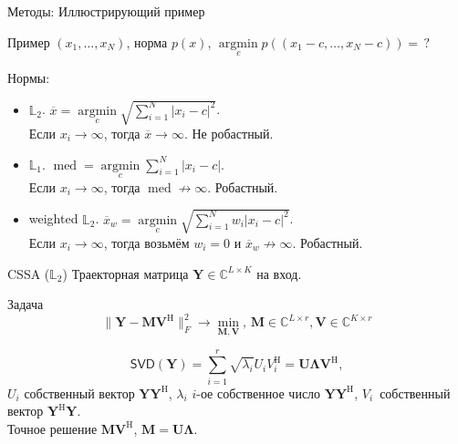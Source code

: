 \documentclass[ucs, notheorems, handout]{beamer}
\DeclareMathOperator{\med}{med}
\DeclareMathOperator*{\argmin}{argmin}
\newcommand{\tX}[1]{\mathsf{#1}}
\begin{document}
\begin{frame}{Методы: Иллюстрирующий пример}
    \begin{block}{Пример}
    $(x_1, \ldots, x_N)$, норма $p(x)$, $\argmin\limits_{c}p((x_1 - c, \ldots, x_N - c)) =\, ?$
    \end{block}
    Нормы:
    \begin{itemize}
        \item $\mathbb{L}_2$. $\overline{x} = \argmin\limits_{c} \sqrt{\sum_{i = 1}^{N} |x_i - c|^2}$. \\
        Если $x_i \to \infty$, тогда $\overline{x} \to \infty$. Не робастный.
        \item $\mathbb{L}_1$. $\med = \argmin\limits_{c} \sum_{i = 1}^{N} |x_i - c|$. \\
        Если $x_i \to \infty$, тогда $\med \not\to \infty$. Робастный.
        \item weighted $\mathbb{L}_2$. $\overline{x}_w = \argmin\limits_{c} \sqrt{\sum_{i = 1}^{N} w_i|x_i - c|^2}$.\\
        Если $x_i \rightarrow \infty$, тогда возьмём $w_i = 0$ и $\overline{x}_w \not\to \infty$. Робастный.
    \end{itemize}
\end{frame}

\begin{frame}{CSSA ($\mathbb{L}_2$)}
    Траекторная матрица $\mathbf{Y} \in \mathbb{C}^{L\times K}$ на вход.\\
    
    \begin{block}{Задача}
    \begin{equation*}
	    \|\mathbf{Y}-\mathbf{M}\mathbf{V}^{\mathrm{H}}\|_F^2 \longrightarrow \min_{\mathbf{M},\mathbf{V}}, \, \mathbf{M} \in \mathbb{C}^{L\times r}, \mathbf{V} \in \mathbb{C}^{K\times r}
    \end{equation*}
    \end{block}
    $$\tX{SVD}(\mathbf{Y}) = \sum_{i = 1}^{r} \sqrt{\lambda_i}U_i V_i^{\mathrm{H}} = \mathbf{U} \mathbf{\Lambda} \mathbf{V}^{\mathrm{H}},$$
    $U_i$ собственный вектор $\mathbf{Y} \mathbf{Y}^{\mathrm{H}}$, $\lambda_i$ $i$-ое  собственное число $\mathbf{Y} \mathbf{Y}^{\mathrm{H}}$, $V_i$~собственный вектор $\mathbf{Y}^{\mathrm{H}} \mathbf{Y}$.\\
    \vspace{1em}
    Точное решение $\mathbf{M}\mathbf{V}^{\mathrm{H}}$, $\mathbf{M} = \mathbf{U} \mathbf{\Lambda}$.

    \note{}
\end{frame}
\end{document}
